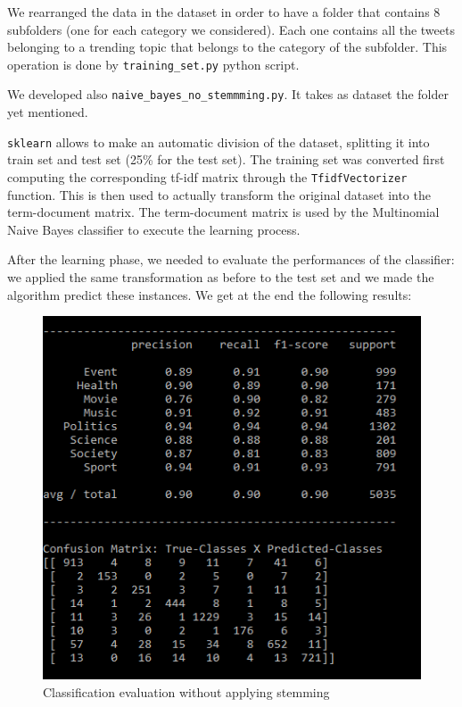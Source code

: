 \documentclass[journal,11pt]{vgtc}
\begin{document}
We rearranged the data in the dataset in order to have a folder that contains 8 subfolders (one for each
category we considered). Each one contains all the tweets belonging to a trending topic that belongs to the category of the subfolder.
This operation is done by \texttt{training\_set.py} python script.

We developed also \texttt{naive\_bayes\_no\_stemmming.py}. It takes as dataset the folder yet mentioned.

\texttt{sklearn} allows to make an automatic division of the dataset, splitting it into train set and
test set (25\% for the test set).
The training set was converted first computing the corresponding tf-idf matrix through the \texttt{TfidfVectorizer} function.
This is then used to actually transform the original dataset into the term-document matrix.
The term-document matrix is used by the Multinomial Naive Bayes classifier to execute the learning process.

After the learning phase, we needed to evaluate the performances of the classifier: we applied the same transformation as before
to the test set and we made the algorithm predict these instances. We get at the end the following results:

\begin{figure}[h]
 \centering
 \includegraphics[scale=0.5]{naive_bayes_no_stemming}
 \caption{Classification evaluation without applying stemming}
 \label{no-stemming}
\end{figure}
\end{document}
